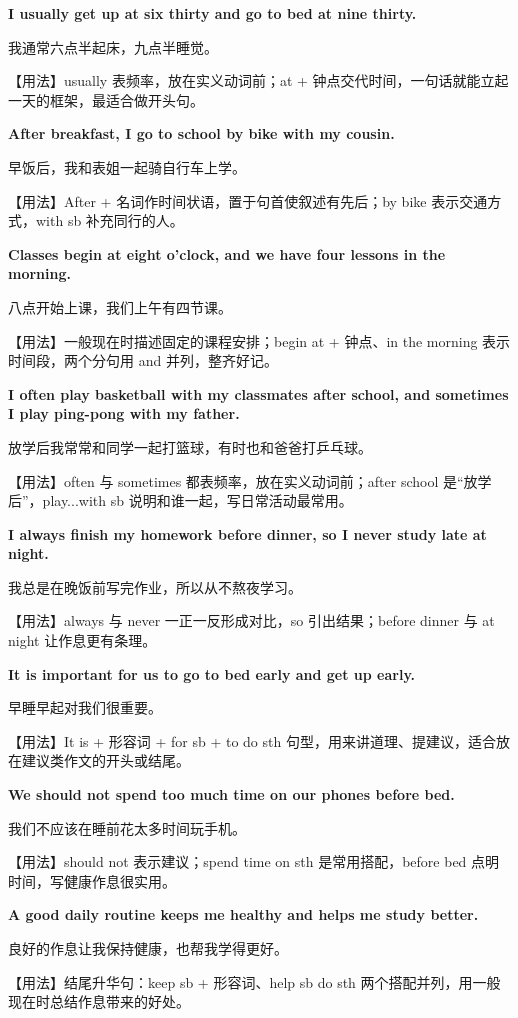 \documentclass[UTF8,a4paper,11pt,oneside]{ctexbook}
\newcommand{\fansection}[1]{%
  \par\addvspace{2.4ex}%
  \Needspace{6\baselineskip}%
  \noindent{\sffamily\Large\bfseries\color{mainblue}#1}\par
  \nopagebreak
  \addvspace{0.2ex}%
  \noindent{\color{rulelight}\rule{\linewidth}{0.9pt}}\par
  \addvspace{0.9ex}%
  \nobreak
}
\newcommand{\fanpat}[3]{%
  \item{\bfseries #1}\par\nopagebreak
  {\small\color{textgray}#2}\par\nopagebreak
  {\footnotesize\color{accent!90!black}【用法】#3}\par
}
\begin{document}
\fansection{〇、本单元写作常用句型}
\begin{fanpatterns}
\fanpat{I usually get up at six thirty and go to bed at nine thirty.}{我通常六点半起床，九点半睡觉。}{usually 表频率，放在实义动词前；at + 钟点交代时间，一句话就能立起一天的框架，最适合做开头句。}

\fanpat{After breakfast, I go to school by bike with my cousin.}{早饭后，我和表姐一起骑自行车上学。}{After + 名词作时间状语，置于句首使叙述有先后；by bike 表示交通方式，with sb 补充同行的人。}

\fanpat{Classes begin at eight o'clock, and we have four lessons in the morning.}{八点开始上课，我们上午有四节课。}{一般现在时描述固定的课程安排；begin at + 钟点、in the morning 表示时间段，两个分句用 and 并列，整齐好记。}

\fanpat{I often play basketball with my classmates after school, and sometimes I play ping-pong with my father.}{放学后我常常和同学一起打篮球，有时也和爸爸打乒乓球。}{often 与 sometimes 都表频率，放在实义动词前；after school 是“放学后”，play...with sb 说明和谁一起，写日常活动最常用。}

\fanpat{I always finish my homework before dinner, so I never study late at night.}{我总是在晚饭前写完作业，所以从不熬夜学习。}{always 与 never 一正一反形成对比，so 引出结果；before dinner 与 at night 让作息更有条理。}

\fanpat{It is important for us to go to bed early and get up early.}{早睡早起对我们很重要。}{It is + 形容词 + for sb + to do sth 句型，用来讲道理、提建议，适合放在建议类作文的开头或结尾。}

\fanpat{We should not spend too much time on our phones before bed.}{我们不应该在睡前花太多时间玩手机。}{should not 表示建议；spend time on sth 是常用搭配，before bed 点明时间，写健康作息很实用。}

\fanpat{A good daily routine keeps me healthy and helps me study better.}{良好的作息让我保持健康，也帮我学得更好。}{结尾升华句：keep sb + 形容词、help sb do sth 两个搭配并列，用一般现在时总结作息带来的好处。}

\end{fanpatterns}

\fansection{一、满分范文}
\end{document}
